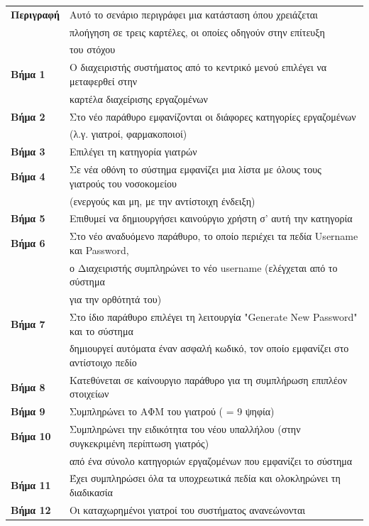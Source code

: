 \documentclass{article}
\newcommand\T{\rule{0pt}{2.6ex}}       %
\newcommand\B{\rule[-1.2ex]{0pt}{0pt}}
\begin{document}
 \begin{center}
     \begin{tabular}{|l|l|}
     \hline
      \textbf{Περιγραφή} & Αυτό το σενάριο περιγράφει μια κατάσταση όπου χρειάζεται \T \\& πλοήγηση σε τρεις καρτέλες, οι οποίες οδηγούν στην επίτευξη \\& του στόχου \B \\ 
      \hline
      \textbf{Βήμα 1} & Ο διαχειριστής συστήματος από το κεντρικό μενού επιλέγει να μεταφερθεί στην \T \\& καρτέλα διαχείρισης εργαζομένων \T\B \\
      \hline
      \textbf{Βήμα 2} & Στο νέο παράθυρο εμφανίζονται οι διάφορες κατηγορίες εργαζομένων \T \\& (λ.γ. γιατροί, φαρμακοποιοί) \B \\
      \hline
      \textbf{Βήμα 3} & Επιλέγει τη κατηγορία γιατρών \T\B \\
      \hline
      \textbf{Βήμα 4} & Σε νέα οθόνη το σύστημα εμφανίζει μια λίστα με όλους τους γιατρούς του νοσοκομείου \T \\& (ενεργούς και μη, με την αντίστοιχη ένδειξη) \B \\
      \hline
      \textbf{Βήμα 5} & Επιθυμεί να δημιουργήσει καινούργιο χρήστη σ' αυτή την κατηγορία \T\B \\
      \hline
      \textbf{Βήμα 6} & Στο νέο αναδυόμενο παράθυρο, το οποίο περιέχει τα πεδία Username και Password, \T \\& ο Διαχειριστής συμπληρώνει το νέο username (ελέγχεται από το σύστημα \\& για την ορθότητά του) \B \\
      \hline
      \textbf{Βήμα 7} & Στο ίδιο παράθυρο επιλέγει τη λειτουργία "Generate New Password" και το σύστημα \T \\& δημιουργεί αυτόματα έναν ασφαλή κωδικό, τον οποίο εμφανίζει στο αντίστοιχο πεδίο\B \\
      \hline
       \textbf{Βήμα 8} & Κατεθύνεται σε καίνουργιο παράθυρο για τη συμπλήρωση επιπλέον στοιχείων \T\B \\
      \hline
      \textbf{Βήμα 9} & Συμπληρώνει το ΑΦΜ του γιατρού ( = 9 ψηφία) \T\B \\
      \hline
      \textbf{Βήμα 10} & Συμπληρώνει την ειδικότητα του νέου υπαλλήλου (στην συγκεκριμένη περίπτωση γιατρός) \T \\& από ένα σύνολο κατηγοριών εργαζομένων που εμφανίζει το σύστημα \B \\
      \hline
      \textbf{Βήμα 11} & Έχει συμπληρώσει όλα τα υποχρεωτικά πεδία και ολοκληρώνει τη διαδικασία \T\B \\
      \hline
      \textbf{Βήμα 12} & Οι καταχωρημένοι γιατροί του συστήματος ανανεώνονται \T\B \\
      \hline
     \end{tabular}
 \end{center}
 
\end{document}
